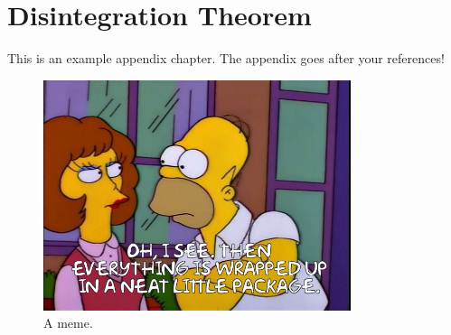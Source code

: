 \chapter{Disintegration Theorem}

\label{appen:disintegration}

This is an example appendix chapter. The appendix goes after your references!

\vspace{2.75cm}
\begin{figure}[H]
\begin{center}
	\includegraphics[width = 9cm]{neat_little_package.jpg}
\end{center}
\caption{A meme.}
\end{figure}
